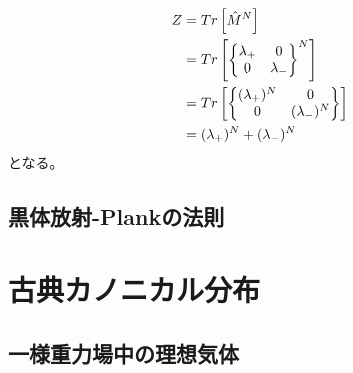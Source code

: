 \documentclass{jsarticle}  %
\numberwithin{equation}{section} %
\numberwithin{figure}{section}
\begin{document}
    \begin{align}
        Z &= Tr\left[ \hat{M}^N \right] \notag \\
        &= Tr \left[ \left\{
        \begin{matrix}
            \lambda_+ &0\\
            0&\lambda_-
        \end{matrix} 
        \right\}^N \right] \notag \\
        &= Tr \left[ \left\{
        \begin{matrix}
            (\lambda_+)^N &0\\
            0&(\lambda_-)^N
        \end{matrix} 
        \right\} \right] \notag \\
        &= (\lambda_+)^N + (\lambda_-)^N
    \end{align}
    となる。
\subsection{黒体放射-Plankの法則}
\section{古典カノニカル分布}
\subsection{一様重力場中の理想気体}
\end{document}
